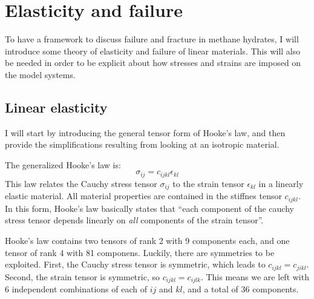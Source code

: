  \chapter{Elasticity and failure}
 To have a framework to discuss failure and fracture in methane hydrates, I will introduce some theory of elasticity and failure of linear materials. This will also be needed in order to be explicit about how stresses and strains are imposed on the model systems.

 \section{Linear elasticity}
I will start by introducing the general tensor form of Hooke's law, and then provide the simplifications resulting from looking at an isotropic material.

The generalized Hooke's law	is:
\begin{equation}
	\sigma_{ij} = c_{ijkl}\epsilon_{kl}
\end{equation}
This law relates the Cauchy stress tensor $\sigma_{ij}$ to the strain tensor $\epsilon_{kl}$ in a linearly elastic material. All material properties are contained in the stiffnes tensor $c_{ijkl}$.
In this form, Hooke's law basically states that ``each component of the cauchy stress tensor depends linearly on \emph{all} components of the strain tensor''. 

Hooke's law contains two tensors of rank 2 with 9 components each, and one tensor of rank 4 with 81 componens. Luckily, there are symmetries to be exploited. First, the Cauchy stress tensor is symmetric, which leads to $c_{ijkl} = c_{jikl}$. Second, the strain tensor is symmetric, so $c_{ijkl} = c_{ijlk}$. This means we are left with 6 independent combinations of each of $ij$ and $kl$, and a total of 36 components. 

